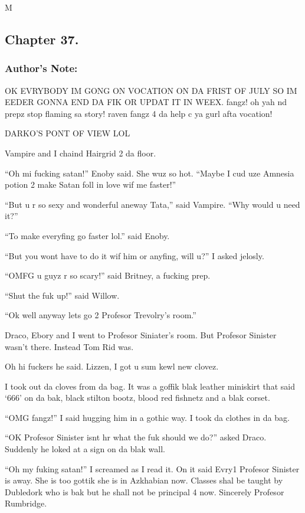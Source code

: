 M\documentclass{article}
\begin{document}
\clearpage\nolinenumbers
\subsection*{Chapter 37.}

\subsubsection*{Author's Note: }OK EVRYBODY IM GONG ON VOCATION ON DA FRIST OF JULY SO IM EEDER GONNA END DA FIK OR UPDAT IT IN WEEX. fangz! oh yah nd prepz stop flaming sa story! raven fangz 4 da help c ya gurl afta vocation!

\textbreak
\linenumbers\resetlinenumber

DARKO’S PONT OF VIEW LOL

Vampire and I chaind Hairgrid 2 da floor.

“Oh mi fucking satan!” Enoby said. She wuz so hot. “Maybe I cud uze Amnesia potion 2 make Satan foll in love wif me faster!”

“But u r so sexy and wonderful aneway Tata,” said Vampire. “Why would u need it?”

“To make everyfing go faster lol.” said Enoby.

“But you wont have to do it wif him or anyfing, will u?” I asked jelosly.

“OMFG u guyz r so scary!” said Britney, a fucking prep.

“Shut the fuk up!” said Willow.

“Ok well anyway lets go 2 Profesor Trevolry’s room.”

Draco, Ebory and I went to Profesor Siniater’s room. But Profesor Sinister wasn’t there. Instead Tom Rid was.

Oh hi fuckers he said. Lizzen, I got u sum kewl new clovez.

I took out da cloves from da bag. It was a goffik blak leather miniskirt that said ‘666’ on da bak, black stilton bootz, blood red fishnetz and a blak corset.

“OMG fangz!” I said hugging him in a gothic way. I took da clothes in da bag.

“OK Profesor Sinister isnt hr what the fuk should we do?” asked Draco. Suddenly he loked at a sign on da blak wall.

“Oh my fuking satan!” I screamed as I read it. On it said Evry1 Profesor Sinister is away. She is too gottik she is in Azkhabian now. Classes shal be taught by Dubledork who is bak but he shall not be principal 4 now. Sincerely Profesor Rumbridge.
\end{document}
